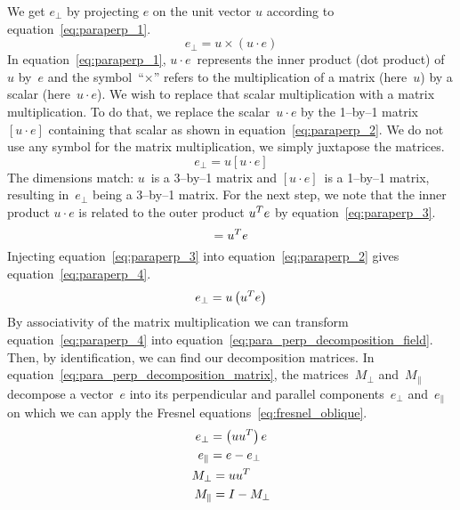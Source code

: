 We get $e_\perp$ by projecting $e$ on the unit vector $u$ according to equation~\eqref{eq:paraperp_1}.
\begin{equation}
    e_\perp = u \times (u \cdot e) \label{eq:paraperp_1}
\end{equation}
In equation~\eqref{eq:paraperp_1}, $u \cdot e$~represents the inner product (dot product) of~$u$ by~$e$ and the symbol~``$\times$'' refers to the multiplication of a matrix (here~$u$) by a scalar (here~$u \cdot e$).
We wish to replace that scalar multiplication with a matrix multiplication.
To do that, we replace the scalar~$u \cdot e$ by the 1--by--1 matrix~$[u \cdot e]$ containing that scalar as shown in equation~\eqref{eq:paraperp_2}.
We do not use any symbol for the matrix multiplication, we simply juxtapose the matrices.
\begin{equation}
    e_\perp = u [u \cdot e] \label{eq:paraperp_2}
\end{equation}
The dimensions match: $u$~is a 3--by--1 matrix and $[u \cdot e]$~is a 1--by--1 matrix, resulting in~$e_\perp$ being a 3--by--1 matrix.
For the next step, we note that the inner product $u \cdot e$ is related to the outer product $u^T e$ by equation~\eqref{eq:paraperp_3}.
\begin{equation}
    [u \cdot e] = u\transp e \label{eq:paraperp_3}
\end{equation}
Injecting equation~\eqref{eq:paraperp_3} into equation~\eqref{eq:paraperp_2} gives equation~\eqref{eq:paraperp_4}.
\begin{equation}
    e_\perp = u \left( u^T e \right) \label{eq:paraperp_4}
\end{equation}
By associativity of the matrix multiplication we can transform equation~\eqref{eq:paraperp_4} into equation~\eqref{eq:para_perp_decomposition_field}.
Then, by identification, we can find our decomposition matrices.
In equation~\eqref{eq:para_perp_decomposition_matrix}, the matrices~$M_\perp$ and~$M_\parallel$ decompose a vector~$e$ into its perpendicular and parallel components~$e_\perp$ and~$e_\parallel$ on which we can apply the Fresnel equations~\eqref{eq:fresnel_oblique}.
\begin{gather}
    \begin{aligned}
        e_\perp &= \left(u u^T \right) e
        \\
        e_\parallel &= e - e_\perp
    \end{aligned}
    \label{eq:para_perp_decomposition_field}
    \\
    \begin{aligned}
        M_\perp &= u u^T   \\
        M_\parallel & = I - M_\perp
    \end{aligned}
    \label{eq:para_perp_decomposition_matrix}
\end{gather}

